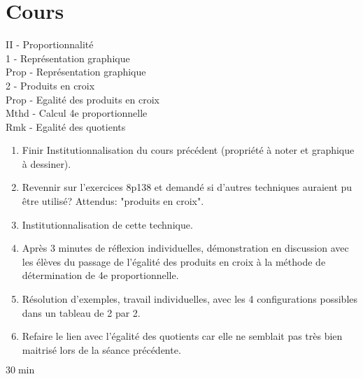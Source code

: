 {{        \section*{Cours}
        \color{Red}II - Proportionnalité\\
        \color{Green}1 - Représentation graphique\\
        \color{black}Prop - Représentation graphique\\
        \color{Green}2 - Produits en croix\\
        \color{black}Prop - Egalité des produits en croix\\
        Mthd - Calcul 4e proportionnelle\\
        Rmk - Egalité des quotients\\
    }{
        \begin{enumerate}[wide=1pt, leftmargin=*]
            \item Finir Institutionnalisation du cours précédent
            (propriété à noter et graphique à dessiner).
            \item Revennir sur l'exercices 8p138 et demandé si d'autres techniques auraient pu être utilisé?
            Attendus: "produits en croix".
            \item Institutionnalisation de cette technique.
            \item Après 3 minutes de réflexion individuelles,
            démonstration en discussion avec les élèves du passage de l'égalité des produits en croix à la méthode de détermination de 4e proportionnelle.
            \item Résolution d'exemples, travail individuelles,
            avec les 4 configurations possibles dans un tableau de 2 par 2.
            \item Refaire le lien avec l'égalité des quotients car elle ne semblait pas très bien maitrisé lors de la séance précédente.
        \end{enumerate}
    }{
        $30\min$
    }

}
